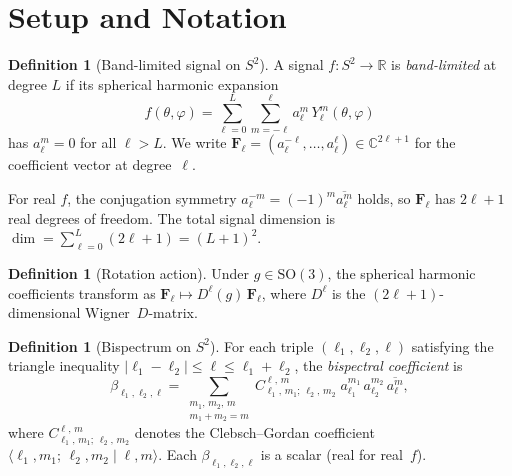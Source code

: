 \documentclass{article}
\theoremstyle{plain}
\theoremstyle{definition}
\newtheorem{definition}[theorem]{Definition}
\theoremstyle{remark}
\newcommand{\SO}{\mathrm{SO}}
\newcommand{\SH}{Y}
\newcommand{\CG}[6]{C^{#5,\,#6}_{#1,\,#2;\,#3,\,#4}}
\newcommand{\abs}[1]{\lvert #1 \rvert}
\newcommand{\R}{\mathbb{R}}
\newcommand{\C}{\mathbb{C}}
\newcommand{\conj}[1]{\overline{#1}}
\begin{document}
\section{Setup and Notation}\label{sec:setup}

\begin{definition}[Band-limited signal on $S^2$]
A signal $f : S^2 \to \R$ is \emph{band-limited} at degree $L$ if its
spherical harmonic expansion
\begin{equation}\label{eq:sh-expansion}
  f(\theta, \varphi)
  = \sum_{\ell=0}^{L} \sum_{m=-\ell}^{\ell}
    a_\ell^m \, \SH_\ell^m(\theta, \varphi)
\end{equation}
has $a_\ell^m = 0$ for all $\ell > L$. We write
$\mathbf{F}_\ell = (a_\ell^{-\ell}, \dotsc, a_\ell^{\ell})
  \in \C^{2\ell+1}$
for the coefficient vector at degree~$\ell$.
\end{definition}

\noindent
For real $f$, the conjugation symmetry
$a_\ell^{-m} = (-1)^m \conj{a_\ell^m}$ holds, so
$\mathbf{F}_\ell$ has $2\ell+1$ real degrees of freedom.
The total signal dimension is
$\dim = \sum_{\ell=0}^{L}(2\ell+1) = (L+1)^2$.

\begin{definition}[Rotation action]\label{def:rotation-action}
Under $g \in \SO(3)$, the spherical harmonic coefficients transform as
$\mathbf{F}_\ell \mapsto D^\ell(g)\,\mathbf{F}_\ell$,
where $D^\ell$ is the $(2\ell+1)$-dimensional Wigner~$D$-matrix.
\end{definition}

\begin{definition}[Bispectrum on $S^2$]\label{def:bispectrum}
For each triple $(\ell_1, \ell_2, \ell)$ satisfying the triangle
inequality $\abs{\ell_1 - \ell_2} \le \ell \le \ell_1 + \ell_2$,
the \emph{bispectral coefficient} is
\begin{equation}\label{eq:bispectrum}
  \beta_{\ell_1,\ell_2,\ell}
  = \sum_{\substack{m_1,\,m_2,\,m \\ m_1+m_2=m}}
    \CG{\ell_1}{m_1}{\ell_2}{m_2}{\ell}{m}\;
    a_{\ell_1}^{m_1}\,a_{\ell_2}^{m_2}\,\conj{a_\ell^m},
\end{equation}
where $\CG{\ell_1}{m_1}{\ell_2}{m_2}{\ell}{m}$ denotes the
Clebsch--Gordan coefficient
$\langle \ell_1, m_1;\, \ell_2, m_2 \mid \ell, m \rangle$.
Each $\beta_{\ell_1,\ell_2,\ell}$ is a scalar (real for real~$f$).
\end{definition}
\end{document}

